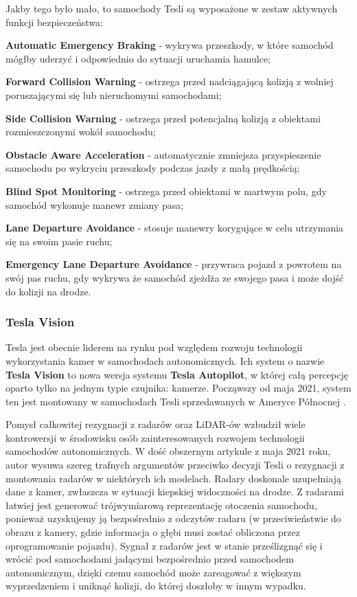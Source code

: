 Jakby tego było mało, to samochody Tesli są wyposażone w zestaw aktywnych funkcji bezpieczeństwa:
\vspace{-0.25cm}
\begin{enumerate*}
\item \textbf{Automatic Emergency Braking} - wykrywa przeszkody, w które samochód mógłby uderzyć i odpowiednio do sytuacji uruchamia hamulce;
\item \textbf{Forward Collision Warning} - ostrzega przed nadciągającą kolizją z wolniej poruszającymi się lub nieruchomymi samochodami;
\item \textbf{Side Collision Warning} - ostrzega przed potencjalną kolizją z obiektami rozmieszczonymi wokół samochodu;
\item \textbf{Obstacle Aware Acceleration} - automatycznie zmniejsza przyspieszenie samochodu po wykryciu przeszkody podczas jazdy z małą prędkością;
\item \textbf{Blind Spot Monitoring} - ostrzega przed obiektami w martwym polu, gdy samochód wykonuje manewr zmiany pasa;
\item \textbf{Lane Departure Avoidance} - stosuje manewry korygujące w celu utrzymania się na swoim pasie ruchu;
\item \textbf{Emergency Lane Departure Avoidance} - przywraca pojazd z powrotem na swój pas ruchu, gdy wykrywa że samochód zjeżdża ze swojego pasa i może dojść do kolizji na drodze.
\end{enumerate*}

\subsubsection{Tesla Vision}
Tesla jest obecnie liderem na rynku pod względem rozwoju technologii wykorzystania kamer w samochodach autonomicznych. Ich system o nazwie 
\textbf{Tesla Vision} to nowa wersja systemu \textbf{Tesla Autopilot}, w której całą percepcję oparto tylko na jednym typie czujnika: kamerze. Począwszy od maja 2021, system ten jest montowany w samochodach Tesli sprzedawanych w Ameryce Północnej \cite{tesla:transToVision}.

Pomysł całkowitej rezygnacji z radarów oraz LiDAR-ów wzbudził wiele kontrowersji w środowisku osób zainteresowanych rozwojem technologii samochodów autonomicznych. W dość obszernym artykule \cite{torchinsky:teslaRemoveRadar} z maja 2021 roku, autor wysuwa szereg trafnych argumentów przeciwko decyzji Tesli o rezygnacji z montowania radarów w niektórych ich modelach. Radary doskonale uzupełniają dane z kamer, zwłaszcza w sytuacji kiepskiej widoczności na drodze. Z radarami łatwiej jest generować trójwymiarową reprezentację otoczenia samochodu, ponieważ uzyskujemy ją bezpośrednio z odczytów radaru (w przeciwieństwie do obrazu z kamery, gdzie informacja o głębi musi zostać obliczona przez oprogramowanie pojazdu). Sygnał z radarów jest w stanie prześlizgnąć się i wrócić pod samochodami jadącymi bezpośrednio przed samochodem autonomicznym, dzięki czemu samochód może zareagować z większym wyprzedzeniem i uniknąć kolizji, do której doszłoby w innym wypadku.

